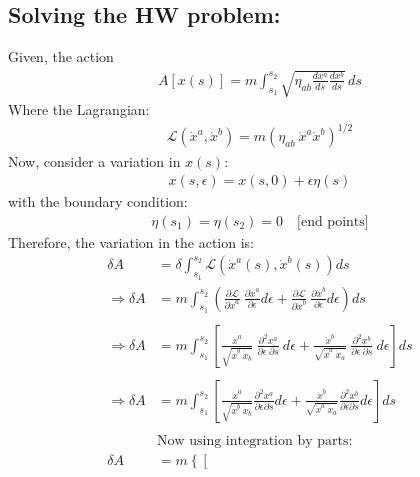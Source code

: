 \documentclass[14pt]{article} %
\begin{document}
\begin{framed}
\vspace{-0.5cm}
\subsection*{Solving the HW problem:}
Given, the action
\begin{align*}
A[x(s)] = m \int_{s_1}^{s_2} \sqrt{\eta_{ab} \frac{dx^a}{ds} \frac{dx^b}{ds}} \, ds
\end{align*}
Where the Lagrangian:
\begin{align*}
\mathcal{L}(\dot{x}^a, \dot{x}^b) = m\left( \eta_{ab}~\dot{x}^a\dot{x}^b \right)^{1/2}
\end{align*}
\noindent
Now, consider a variation in $x(s)$:
\begin{align*}
x(s,\epsilon) = x(s,0) + \epsilon\eta(s)
\end{align*}
with the boundary condition:
\begin{align*}
\eta(s_1) = \eta(s_2) = 0 \quad \text{[end points]}
\end{align*}
Therefore, the variation in the action is:
\begin{align*}
\delta A &= \delta \int_{s_1}^{s_2} \mathcal{L} \left( \dot{x}^a\left( s \right), \dot{x}^b \left(s\right) \right) ds \\
\Rightarrow \delta A &= m \int_{s_1}^{s_2} \left( \frac{\partial \mathcal{L}}{\partial \dot{x}^a}~ \frac{\partial \dot{x}^a}{\partial \epsilon} d\epsilon + \frac{\partial \mathcal{L}}{\partial \dot{x}^b}~\frac{\partial \dot{x}^b}{\partial \epsilon} d\epsilon \right) ds \\
\\
\Rightarrow \delta A &= m \int_{s_1}^{s_2} \left[ 
\frac{\dot{x}^a}{\sqrt{\dot{x}^b~ \dot{x}_b}}~ \frac{\partial^2 {x}^a}{\partial \epsilon~\partial s}~d \epsilon 
+ 
\frac{\dot{x}^b}{\sqrt{\dot{x}^a~\dot{x}_a}}~ \frac{\partial^2{x}^b}{\partial \epsilon~\partial s}~d\epsilon 
\right] ds \\
\\
\Rightarrow \delta A &= m \int_{s_1}^{s_2} \left[ 
\frac{\dot{x}^a}{\sqrt{\dot{x}^b~\dot{x}_b}} \frac{\partial^2{x}^a}{\partial \epsilon \partial s} d \epsilon 
+ 
\frac{\dot{x}^b}{\sqrt{\dot{x}^a~\dot{x}_a}} \frac{\partial^2 {x}^b}{\partial \epsilon \partial s} d \epsilon
\right] ds \\
\\
&\text{Now using integration by parts:} \\
\delta A &= m
\left\{ 
\left[ 

\end{align*}
\end{framed}
\end{document}
